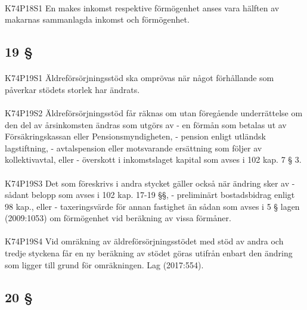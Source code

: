 \documentclass[a4paper,notitlepage,openany,10pt]{book}
\begin{document}
\paragraph*{}
{\tiny K74P18S1}
En makes inkomst respektive förmögenhet anses vara hälften av makarnas sammanlagda inkomst och förmögenhet.
\subsection*{19 §}
\paragraph*{}
{\tiny K74P19S1}
Äldreförsörjningsstöd ska omprövas när något förhållande som påverkar stödets storlek har ändrats.
\paragraph*{}
{\tiny K74P19S2}
Äldreförsörjningsstöd får räknas om utan föregående underrättelse om den del av årsinkomsten ändras som utgörs av
\newline - en förmån som betalas ut av Försäkringskassan eller Pensionsmyndigheten,
\newline - pension enligt utländsk lagstiftning,
\newline - avtalspension eller motsvarande ersättning som följer av kollektivavtal, eller
\newline - överskott i inkomstslaget kapital som avses i 102 kap. 7 § 3.
\paragraph*{}
{\tiny K74P19S3}
Det som föreskrivs i andra stycket gäller också när ändring sker av
\newline - sådant belopp som avses i 102 kap. 17-19 §§,
\newline - preliminärt bostadsbidrag enligt 98 kap., eller
\newline - taxeringsvärde för annan fastighet än sådan som avses i 5 § lagen (2009:1053) om förmögenhet vid beräkning av vissa förmåner.
\paragraph*{}
{\tiny K74P19S4}
Vid omräkning av äldreförsörjningsstödet med stöd av andra och tredje styckena får en ny beräkning av stödet göras utifrån enbart den ändring som ligger till grund för omräkningen.
Lag (2017:554).
\subsection*{20 §}
\end{document}
